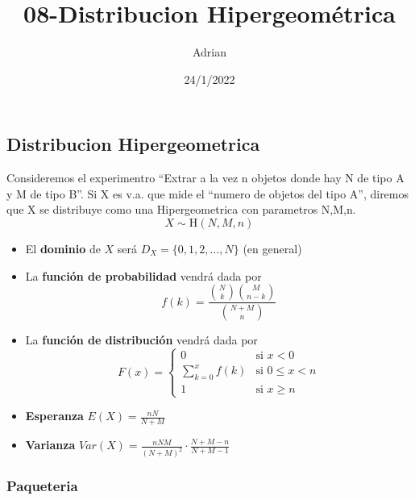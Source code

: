 \documentclass[
]{article}
\title{08-Distribucion Hipergeométrica}
\author{Adrian}
\date{24/1/2022}
\begin{document}
\maketitle

\hypertarget{distribucion-hipergeometrica}{%
\subsection{Distribucion
Hipergeometrica}\label{distribucion-hipergeometrica}}

Consideremos el experimentro ``Extrar a la vez n objetos donde hay N de
tipo A y M de tipo B''. Si X es v.a. que mide el ``numero de objetos del
tipo A'', diremos que X se distribuye como una Hipergeometrica con
parametros N,M,n. \[X\sim \text{H}(N,M,n)\]

\begin{itemize}
\item
  El \textbf{dominio} de \(X\) será \(D_X = \{0,1,2,\dots,N\}\) (en
  general)
\item
  La \textbf{función de probabilidad} vendrá dada por
  \[f(k) = \frac{{N\choose k}{M\choose n-k}}{N+M\choose n}\]
\item
  La \textbf{función de distribución} vendrá dada por \[F(x) = \left\{
  \begin{array}{cl}
     0 & \text{si } x<0 
  \\ \sum_{k=0}^xf(k) & \text{si } 0\le x<n
  \\ 1 & \text{si } x\ge n
  \end{array}
  \right.\]
\item
  \textbf{Esperanza} \(E(X) = \frac{nN}{N+M}\)
\item
  \textbf{Varianza}
  \(Var(X) = \frac{nNM}{(N+M)^2}\cdot\frac{N+M-n}{N+M-1}\)
\end{itemize}

\hypertarget{paqueteria}{%
\subsubsection{Paqueteria}\label{paqueteria}}
\end{document}

